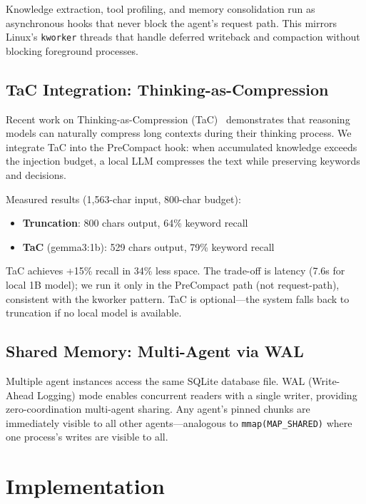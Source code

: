 \documentclass[10pt,twocolumn]{article}
\begin{document}
Knowledge extraction, tool profiling, and memory consolidation run as asynchronous hooks that never block the agent's request path. This mirrors Linux's \texttt{kworker} threads that handle deferred writeback and compaction without blocking foreground processes.

\subsection{TaC Integration: Thinking-as-Compression}

Recent work on Thinking-as-Compression (TaC)~\cite{tac2026} demonstrates that reasoning models can naturally compress long contexts during their thinking process. We integrate TaC into the PreCompact hook: when accumulated knowledge exceeds the injection budget, a local LLM compresses the text while preserving keywords and decisions.

Measured results (1{,}563-char input, 800-char budget):
\begin{itemize}[leftmargin=*,nosep]
  \item \textbf{Truncation}: 800 chars output, 64\% keyword recall
  \item \textbf{TaC} (gemma3:1b): 529 chars output, 79\% keyword recall
\end{itemize}
TaC achieves +15\% recall in 34\% less space. The trade-off is latency (7.6s for local 1B model); we run it only in the PreCompact path (not request-path), consistent with the kworker pattern. TaC is optional---the system falls back to truncation if no local model is available.

\subsection{Shared Memory: Multi-Agent via WAL}

Multiple agent instances access the same SQLite database file. WAL (Write-Ahead Logging) mode enables concurrent readers with a single writer, providing zero-coordination multi-agent sharing. Any agent's pinned chunks are immediately visible to all other agents---analogous to \texttt{mmap(MAP\_SHARED)} where one process's writes are visible to all.

\section{Implementation}
\label{sec:impl}
\end{document}
